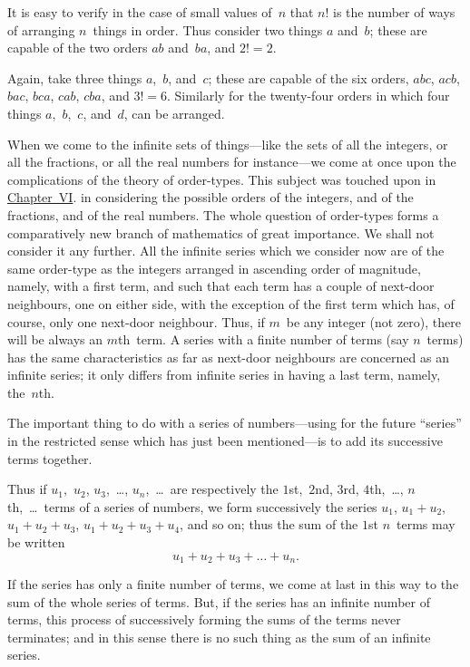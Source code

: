 \documentclass[12pt,leqno]{book}[2005/09/16]
\newcommand{\Typo}[2]{#2}
\newcommand{\Chg}[2]{#2}
\newcommand{\Add}[1]{\Chg{}{#1}}
\newcommand{\ChapRef}[2][Chapter]{\hyperref[chapter:#2]{\Chg{#1}{Chapter}~#2}}
\newcommand{\PageSep}[1]{\ignorespaces}
\begin{document}
It is easy to verify in the case of small
values of~$n$ that $n!$ is the number of ways
of arranging $n$~things in order. Thus consider
two things $a$ and~$b$; these are capable
of the two orders $ab$ and~$ba$, and $2! = 2$.

Again, take three things $a$,~$b$, and~$c$; these
are capable of the six orders, $abc$, $acb$, $bac$,
$bca$, $cab$, $cba$, and $3! = 6$. Similarly for the
twenty-four orders in which four things $a$,~$b$,~$c$,
and~$d$, can be arranged.

When we come to the infinite sets of things---like
%
the sets of all the integers, or all the
fractions, or all the real numbers for instance---we
come at once upon the complications of
the theory of order-types. This subject was
touched upon in \ChapRef{VI}. in considering
the possible orders of the integers, and of the
fractions, and of the real numbers. The
whole question of order-types forms a comparatively
new branch of mathematics of
great importance. We shall not consider it
any further. All the infinite series which we
consider now are of the same order-type as
the integers arranged in ascending order of
magnitude, namely, with a first term, and
such that each term has a couple of next-door
neighbours, one on either side, with the
exception of the first term which has, of
course, only one next-door neighbour. Thus,
if $m$~be any integer (not zero), there will be
always an $m$th~term. A series with a finite
\PageSep{197}
number of terms (say $n$~terms) has the same
characteristics as far as next-door neighbours
are concerned as an infinite series; it only
differs from infinite series in having a last
term, namely, the~$n$th.

The important thing to do with a series of
numbers---using for the future ``series'' in
the restricted sense which has just been mentioned---is
to add its successive terms together.

Thus if $u_{1}$,~$u_{2}$, $u_{3}$,~\dots\Add{,} $u_{n}$,~\dots\ are respectively
the $1$st,~$2$nd, $3$rd, $4$th,~\dots\Add{,} $n$th,~\dots\
terms of a series of numbers, we form successively
the series $u_{1}$, $u_{1} + u_{2}$, $u_{1} + u_{2} + u_{3}$, $u_{1} + u_{2} + u_{3} + u_{4}$,
and so on; thus the sum of the
$1$st $n$~terms may be written\Typo{.}{}
\[
u_{1} + u_{2} + u_{3} + \dots + u_{n}.
\]

If the series has only a finite number of
%
terms, we come at last in this way to the
sum of the whole series of terms. But, if
the series has an infinite number of terms,
this process of successively forming the sums
of the terms never terminates; and in this
sense there is no such thing as the sum of an
infinite series.
\end{document}

